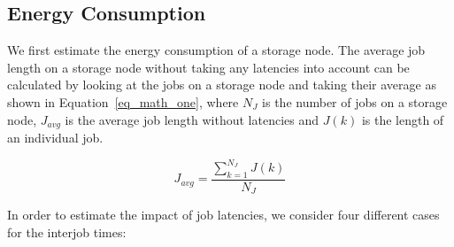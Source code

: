 \documentclass[preprint,12pt]{elsarticle}
\begin{document}
\subsection{Energy Consumption}
We first estimate the energy consumption of a storage node.
The average job length
on a storage node without taking any latencies into account can be
calculated by
looking at the jobs on a storage node and taking their average as shown in 
Equation~\eqref{eq_math_one}, where $N_{J}$ is the number of jobs on a
storage node, $J_{avg}$ is the average job length without latencies and $J(k)$
is the length of an individual job.

\begin{equation}
J_{avg} = \frac{\sum\limits_{k=1}^{N_{J}} J(k)}{N_{J}}
\label{eq_math_one}
\end{equation}  
\hfill

In order to estimate the impact of job latencies,
we consider four different cases for the interjob
times:
\end{document}
